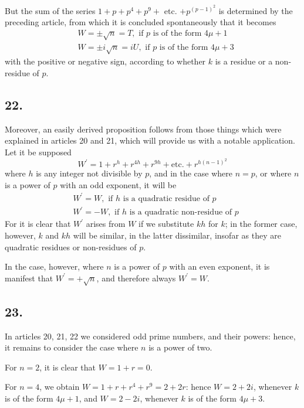 \documentclass[twoside,12pt, showframe]{memoir}
\begin{document}
But the sum of the series \(1+p+p^{4}+p^{9}+\) etc. \(+p^{(p-1)^{2}}\) is determined by the preceding article, from which it is concluded spontaneously that it becomes
\[\begin{aligned}
& W= \pm \sqrt{n}=T, \text{ if } p \text{ is of the form } 4 \mu+1 \\
& W= \pm i \sqrt{n}=i U, \text{ if } p \text{ is of the form } 4 \mu+3
\end{aligned}\]
with the positive or negative sign, according to whether \(k\) is a residue or a non-residue of \(p\).
%

\subsection*{22.}

Moreover, an easily derived proposition follows from those things which were explained in articles 20 and 21, which will provide us with a notable application. Let it be supposed
\[W^{\prime}=1+r^{h}+r^{4 h}+r^{9 h}+\text{etc.}+r^{h(n-1)^{2}}\]\clearpage\noindent%
where \(h\) is any integer not divisible by \(p\), and in the case where \(n=p\), or where \(n\) is a power of \(p\) with an odd exponent, it will be
\[\begin{aligned}
& W^{\prime}=W, \text{ if } h \text{ is a quadratic residue of } p \\
& W^{\prime}=-W, \text{ if } h \text{ is a quadratic non-residue of } p
\end{aligned}\]
For it is clear that \(W^{\prime}\) arises from \(W\) if we substitute \(kh\) for \(k\); in the former case, however, \(k\) and \(kh\) will be similar, in the latter dissimilar, insofar as they are quadratic residues or non-residues of \(p\).

In the case, however, where \(n\) is a power of \(p\) with an even exponent, it is manifest that \(W^{\prime}=+\sqrt{n}\), and therefore always \(W^{\prime}=W\).
%

\subsection*{23.}
 
In articles 20, 21, 22 we considered odd prime numbers, and their powers: hence, it remains to consider the case where \(n\) is a power of two.
 
For \(n=2\), it is clear that \(W=1+r=0\).
 
For \(n=4\), we obtain \(W=1+r+r^{4}+r^{9}=2+2 r\): hence \(W=2+2 i\), whenever \(k\) is of the form \(4 \mu+1\), and \(W=2-2 i\), whenever \(k\) is of the form \(4 \mu+3\).
 
\end{document}
